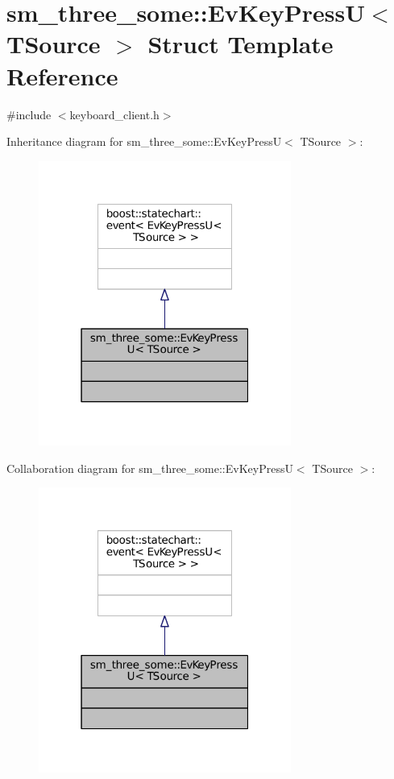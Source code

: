 \hypertarget{structsm__three__some_1_1EvKeyPressU}{}\section{sm\+\_\+three\+\_\+some\+:\+:Ev\+Key\+PressU$<$ T\+Source $>$ Struct Template Reference}
\label{structsm__three__some_1_1EvKeyPressU}


{\ttfamily \#include $<$keyboard\+\_\+client.\+h$>$}



Inheritance diagram for sm\+\_\+three\+\_\+some\+:\+:Ev\+Key\+PressU$<$ T\+Source $>$\+:
\nopagebreak
\begin{figure}[H]
\begin{center}
\leavevmode
\includegraphics[width=235pt]{structsm__three__some_1_1EvKeyPressU__inherit__graph}
\end{center}
\end{figure}


Collaboration diagram for sm\+\_\+three\+\_\+some\+:\+:Ev\+Key\+PressU$<$ T\+Source $>$\+:
\nopagebreak
\begin{figure}[H]
\begin{center}
\leavevmode
\includegraphics[width=235pt]{structsm__three__some_1_1EvKeyPressU__coll__graph}
\end{center}
\end{figure}


